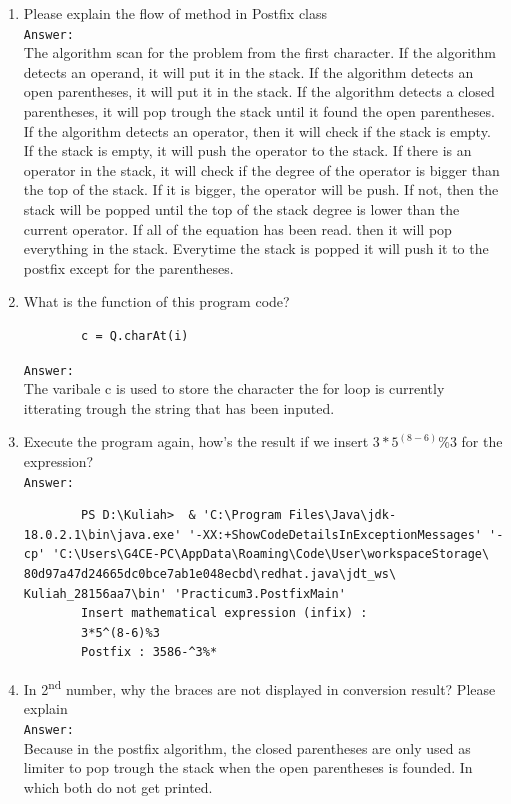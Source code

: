 \documentclass[12pt,titlepage]{article}
\begin{document}
\begin{enumerate}
    \item Please explain the flow of method in Postfix class
    \mbox{}\\
    \texttt{Answer: }
    \mbox{}\\
    The algorithm scan for the problem from the first character. If the algorithm detects an operand, it will put it in the stack. If the algorithm detects an open parentheses, it will put it in the stack. If the algorithm detects a closed parentheses, it will pop trough the stack until it found the open parentheses. If the algorithm detects an operator, then it will check if the stack is empty. If the stack is empty, it will push the operator to the stack. If there is an operator in the stack, it will check if the degree of the operator is bigger than the top of the stack. If it is bigger, the operator will be push. If not, then the stack will be popped until the top of the stack degree is lower than the current operator. If all of the equation has been read. then it will pop everything in the stack. Everytime the stack is popped it will push it to the postfix except for the parentheses.
    \item What is the function of this program code?
    \begin{verbatim}
        c = Q.charAt(i)
    \end{verbatim}
    \texttt{Answer: }
    \mbox{}\\
    The varibale c is used to store the character the for loop is currently itterating trough the string that has been inputed.
    \item Execute the program again, how’s the result if we insert \textbf{$3 * 5 ^ (8-6) \% 3$} for the expression?
    \mbox{}\\
    \texttt{Answer: }
    \begin{verbatim}
        PS D:\Kuliah>  & 'C:\Program Files\Java\jdk-18.0.2.1\bin\java.exe' '-XX:+ShowCodeDetailsInExceptionMessages' '-cp' 'C:\Users\G4CE-PC\AppData\Roaming\Code\User\workspaceStorage\ 80d97a47d24665dc0bce7ab1e048ecbd\redhat.java\jdt_ws\ Kuliah_28156aa7\bin' 'Practicum3.PostfixMain'
        Insert mathematical expression (infix) : 
        3*5^(8-6)%3
        Postfix : 3586-^3%*
    \end{verbatim}
    \item In 2\textsuperscript{nd} number, why the braces are not displayed in conversion result? Please explain
    \mbox{}\\
    \texttt{Answer: }
    \mbox{}\\
    Because in the postfix algorithm, the closed parentheses are only used as limiter to pop trough the stack when the open parentheses is founded. In which both do not get printed.
\end{enumerate}
\end{document}
